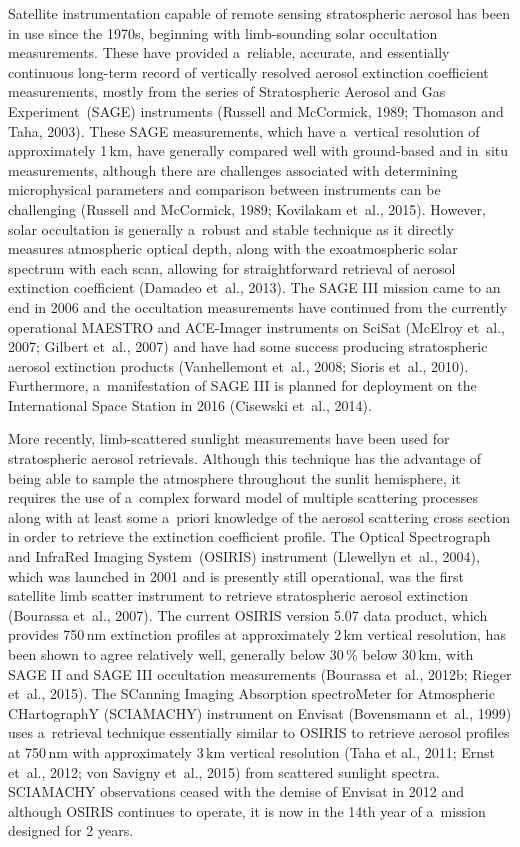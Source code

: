 \documentclass[amt]{copernicus}
\begin{document}
Satellite instrumentation capable of remote sensing stratospheric
aerosol has been in use since the 1970s, beginning with limb-sounding
solar occultation measurements. These have provided a~reliable,
accurate, and essentially continuous long-term record of vertically
resolved aerosol extinction coefficient measurements, mostly from the
series of Stratospheric Aerosol and Gas Experiment~(SAGE) instruments
(Russell and McCormick, 1989; Thomason and Taha, 2003). These SAGE
measurements, which have a~vertical resolution of approximately
1\,\unit{km}, have generally compared well with ground-based and
in~situ measurements, although there are challenges associated with
determining microphysical
parameters and comparison between instruments can be challenging (Russell and McCormick, 1989; Kovilakam et~al.,
2015). However, solar occultation is generally a~robust and stable
technique as it directly measures atmospheric optical depth, along
with the exoatmospheric solar spectrum with each scan, allowing for
straightforward retrieval of aerosol extinction coefficient (Damadeo
et~al., 2013). The SAGE III mission came to an end in 2006 and the occultation
measurements have continued from the currently operational MAESTRO and
ACE-Imager instruments on SciSat (McElroy et~al., 2007; Gilbert
et~al., 2007) and have had some success producing stratospheric aerosol
extinction products (Vanhellemont et~al., 2008; Sioris et~al., 2010).
Furthermore, a~manifestation of SAGE III is planned
for deployment on the International Space Station in 2016 (Cisewski
et~al., 2014).

More recently, limb-scattered sunlight measurements have been used for
stratospheric aerosol retrievals. Although this technique has the
advantage of being able to sample the atmosphere throughout the sunlit
hemisphere, it requires the use of a~complex forward model of multiple
scattering processes along with at least some a~priori knowledge of
the aerosol scattering cross section in order to retrieve the
extinction coefficient profile. The Optical Spectrograph and InfraRed
Imaging System~(OSIRIS) instrument (Llewellyn et~al., 2004), which was
launched in 2001 and is presently still operational, was the first
satellite limb scatter instrument to retrieve stratospheric aerosol
extinction (Bourassa et~al., 2007). The current OSIRIS version 5.07
data product, which provides 750\,\unit{nm} extinction profiles at
approximately 2\,\unit{km} vertical resolution, has been shown to
agree relatively well, generally below 30\,{\%} below 30\,\unit{km}, with SAGE II and SAGE III occultation
measurements  (Bourassa et~al., 2012b; Rieger et~al., 2015). The
SCanning Imaging Absorption spectroMeter for Atmospheric CHartographY
(SCIAMACHY) instrument on Envisat (Bovensmann et~al., 1999) uses
a~retrieval technique essentially similar to OSIRIS to retrieve
aerosol profiles at 750\,\unit{nm} with approximately 3\,\unit{km}
vertical resolution (Taha et al., 2011; Ernst et~al., 2012; von Savigny et~al., 2015)
from scattered sunlight spectra.  SCIAMACHY observations ceased with
the demise of Envisat in 2012 and although OSIRIS continues to
operate, it is now in the 14th year of a~mission designed for
2 years.
\end{document}
